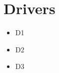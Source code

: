 \section{Drivers}

\begin{itemize}
	\item D1 \label{D1}
	\item D2 \label{D2}
	\item D3 \label{D3}
\end{itemize}